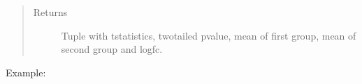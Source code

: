 \documentclass[letterpaper,10pt,english]{sphinxmanual}
\begin{document}
\begin{fulllineitems}
\begin{quote}
\begin{description}
\begin{itemize}
\end{itemize}

\item[{Returns}] \leavevmode
Tuple with t\sphinxhyphen{}statistics, two\sphinxhyphen{}tailed p\sphinxhyphen{}value, mean of first group, mean of second group and logfc.

\end{description}\end{quote}

Example:

\begin{sphinxVerbatim}[commandchars=\\\{\}]
    
\end{sphinxVerbatim}

\end{fulllineitems}

\end{document}
